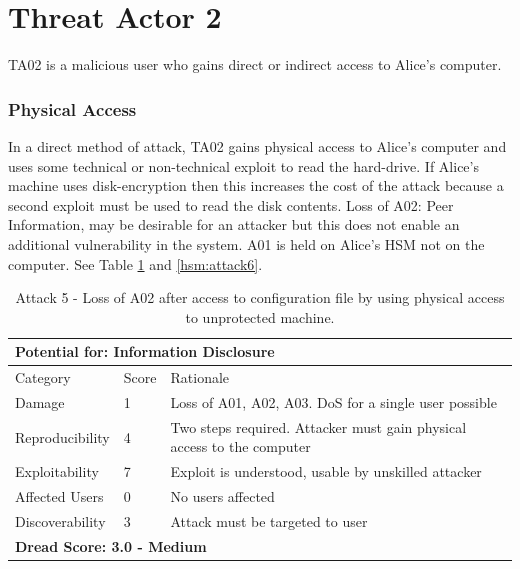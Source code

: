 \documentclass [11pt, proquest] {uwthesis}[2020/02/24]
\begin{document}
\section{Threat Actor 2}
TA02 is a malicious user who gains direct or indirect access to Alice's computer. 

\subsubsection{Physical Access}
In a direct method of attack, TA02 gains physical access to Alice's computer and uses some technical or non-technical exploit to read the hard-drive. If Alice's machine uses disk-encryption then this increases the cost of the attack because a second exploit must be used to read the disk contents.
Loss of A02: Peer Information, may be desirable for an attacker but this does not enable an additional vulnerability in the system.
A01 is held on Alice's HSM not on the computer.
See Table \ref{hsm:attack5} and \ref{hsm:attack6}.

\begin{table}[H]
\begin{tabular}{|m{3cm}|m{1cm}|p{27em} |}
\multicolumn{3}{l}{Potential for: Information Disclosure}   \\
\hline
Category & Score & Rationale \\
\hline
Damage          & 1     & Loss of A01, A02, A03. DoS for a single user possible   \\
\hline
Reproducibility & 4     & Two steps required. Attacker must gain physical access to the computer \\
\hline
Exploitability & 7      & Exploit is understood, usable by unskilled attacker \\
\hline
Affected Users  & 0     &  No users affected   \\
\hline
Discoverability & 3     & Attack must be targeted to user \\
\hline
\multicolumn{3}{l}{\textbf{Dread Score: 3.0 - Medium}} 
\end{tabular}
\caption{Attack 5 - Loss of A02 after access to configuration file by using physical access to unprotected machine.}
\label{hsm:attack5}
\end{table}
\end{document}
